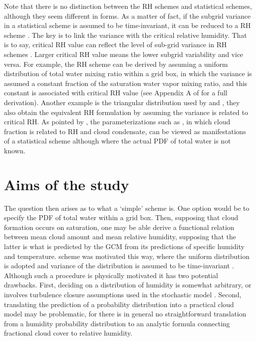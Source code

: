 Note that there is no distinction between the RH schemes and statistical schemes, although they seem different in forms. As a matter of fact, if the subgrid variance in a statistical scheme is assumed to be time-invariant, it can be reduced to a RH scheme \citep{Tompkins2002,Tompkins2005}. The key is to link the variance with the critical relative humidity. That is to say, critical RH value can reflect the level of sub-grid variance in RH schemes \citep{Quaas2012}. Larger critical RH value means the lower subgrid variability and vice versa. For example, the \cite{Sundqvist1978} RH scheme can be derived by assuming a uniform distribution of total water mixing ratio within a grid box, in which the variance is assumed a constant fraction of the saturation water vapor mixing ratio, and this constant is associated with critical RH value (see Appendix A of \cite{Quaas2012} for a full derivation). Another example is the triangular distribution used by \cite{Smith1990} and \cite{Park2014}, they also obtain the equivalent RH formulation by assuming the variance is related to critical RH. As pointed by \cite{Tompkins2002}, the parameterizations such as \cite{Xu1996}, in which cloud fraction is related to RH and cloud condensate, can be viewed as manifestations of a statistical scheme although where the actual PDF of total water is not known. %

\section{Aims of the study}
\label{sec:why_simple_cld_schem_in_isca}

The question then arises as to what a `simple' scheme is. One option would be to specify the PDF of total water within a grid box. Then, supposing that cloud formation occurs on saturation, one may be able derive a functional relation between mean cloud amount and mean relative humidity, supposing that the latter is what is predicted by the GCM from its predictions of specific humidity and temperature. \citet{Sundqvist1989} scheme was motivated this way, where the uniform distribution is adopted and variance of the distribution is assumed to be time-invariant \citep{Tompkins2005}. Although such a procedure is physically motivated it has two potential drawbacks. First, deciding on a distribution of humidity is somewhat arbitrary, or involves turbulence closure assumptions used in the stochastic model \citep{Sommeria1977,Tsang2018}. Second, translating the prediction of a probability distribution into a practical cloud model may be problematic, for there is in general no straightforward translation from a humidity probability distribution to an analytic formula connecting fractional cloud cover to relative humidity. 


